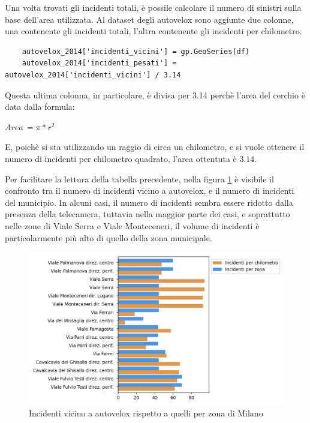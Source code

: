 \documentclass[a4paper,12pt]{report}
\begin{document}

Una volta trovati gli incidenti totali, è possile calcolare il numero di sinistri 
sulla base dell'area utilizzata.
Al dataset degli autovelox sono aggiunte due colonne, una contenente gli incidenti totali, 
l'altra contenente gli incidenti per chilometro.

\begin{lstlisting}
    autovelox_2014['incidenti_vicini'] = gp.GeoSeries(df)
    autovelox_2014['incidenti_pesati'] = autovelox_2014['incidenti_vicini'] / 3.14
\end{lstlisting}

Questa ultima colonna, in particolare, è divisa per 3.14 perchè l'area del cerchio 
è data dalla formula: 

\begin{center}
    $Area\, = \pi * r^2$
\end{center}

E, poichè si sta utilizzando un raggio di circa un chilometro, e si vuole ottenere il 
numero di incidenti per chilometro quadrato, l'area ottentuta è $3.14$.

Per facilitare la lettura della tabella precedente, nella figura \ref{fig:confronto-autovelox} 
è visibile il confronto tra il numero di incidenti vicino a autovelox, e il numero di incidenti 
del municipio.
In alcuni casi, il numero di incidenti sembra essere ridotto dalla presenza della telecamera,  
tuttavia nella maggior parte dei casi, e soprattutto nelle zone di Viale Serra e 
Viale Monteceneri, il volume di incidenti è particolarmente più alto di 
quello della zona municipale.

\begin{figure}
    \includegraphics[width=\linewidth]{../src/municipi_milano/conclusioni_municipio.png}
    \caption{Incidenti vicino a autovelox rispetto a quelli per zona di Milano}
    \label{fig:confronto-autovelox}
\end{figure}
\end{document}
